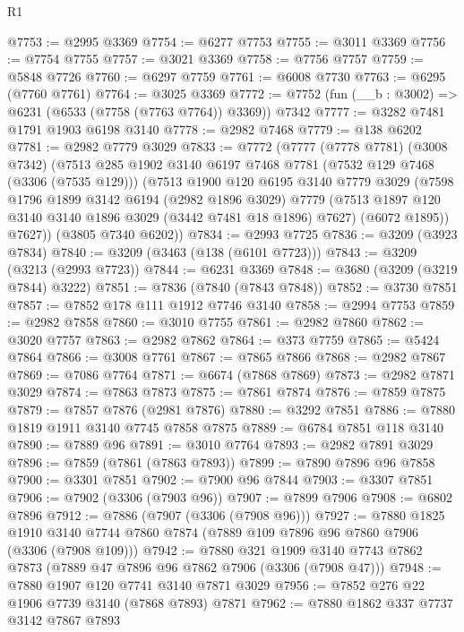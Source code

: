 \begin{lexlean}{R1}
\begin{coremodule}
@7753 := @2995 @3369
@7754 := @6277 @7753
@7755 := @3011 @3369
@7756 := @7754 @7755
@7757 := @3021 @3369
@7758 := @7756 @7757
@7759 := @5848 @7726
@7760 := @6297 @7759
@7761 := @6008 @7730
@7763 := @6295 (@7760 @7761)
@7764 := @3025 @3369
@7772 := @7752 (fun (__b : @3002) => @6231 (@6533 (@7758 (@7763 @7764)) @3369)) @7342
@7777 := @3282 @7481 @1791 @1903 @6198 @3140
@7778 := @2982 @7468
@7779 := @138 @6202
@7781 := @2982 @7779 @3029
@7833 := @7772
    (@7777
      (@7778 @7781)
      (@3008 @7342)
      (@7513
        @285
        @1902
        @3140
        @6197
        @7468
        @7781
        (@7532 @129 @7468 (@3306 (@7535 @129)))
        (@7513
          @1900
          @120
          @6195
          @3140
          @7779
          @3029
          (@7598
            @1796
            @1899
            @3142
            @6194
            (@2982 @1896 @3029)
            @7779
            (@7513 @1897 @120 @3140 @3140 @1896 @3029 (@3442 @7481 @18 @1896) @7627)
            (@6072 @1895))
          @7627))
      (@3805 @7340 @6202))
@7834 := @2993 @7725
@7836 := @3209 (@3923 @7834)
@7840 := @3209 (@3463 (@138 (@6101 @7723)))
@7843 := @3209 (@3213 (@2993 @7723))
@7844 := @6231 @3369
@7848 := @3680 (@3209 (@3219 @7844) @3222)
@7851 := @7836 (@7840 (@7843 @7848))
@7852 := @3730 @7851
@7857 := @7852 @178 @111 @1912 @7746 @3140
@7858 := @2994 @7753
@7859 := @2982 @7858
@7860 := @3010 @7755
@7861 := @2982 @7860
@7862 := @3020 @7757
@7863 := @2982 @7862
@7864 := @373 @7759
@7865 := @5424 @7864
@7866 := @3008 @7761
@7867 := @7865 @7866
@7868 := @2982 @7867
@7869 := @7086 @7764
@7871 := @6674 (@7868 @7869)
@7873 := @2982 @7871 @3029
@7874 := @7863 @7873
@7875 := @7861 @7874
@7876 := @7859 @7875
@7879 := @7857 @7876 (@2981 @7876)
@7880 := @3292 @7851
@7886 := @7880 @1819 @1911 @3140 @7745 @7858 @7875
@7889 := @6784 @7851 @118 @3140
@7890 := @7889 @96
@7891 := @3010 @7764
@7893 := @2982 @7891 @3029
@7896 := @7859 (@7861 (@7863 @7893))
@7899 := @7890 @7896 @96 @7858
@7900 := @3301 @7851
@7902 := @7900 @96 @7844
@7903 := @3307 @7851
@7906 := @7902 (@3306 (@7903 @96))
@7907 := @7899 @7906
@7908 := @6802 @7896
@7912 := @7886 (@7907 (@3306 (@7908 @96)))
@7927 := @7880
    @1825
    @1910
    @3140
    @7744
    @7860
    @7874
    (@7889 @109 @7896 @96 @7860 @7906 (@3306 (@7908 @109)))
@7942 := @7880
    @321
    @1909
    @3140
    @7743
    @7862
    @7873
    (@7889 @47 @7896 @96 @7862 @7906 (@3306 (@7908 @47)))
@7948 := @7880 @1907 @120 @7741 @3140 @7871 @3029
@7956 := @7852 @276 @22 @1906 @7739 @3140 (@7868 @7893) @7871
@7962 := @7880 @1862 @337 @7737 @3142 @7867 @7893

\end{coremodule}
\end{lexlean}

